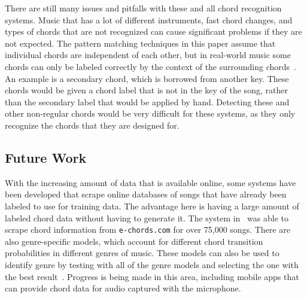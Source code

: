 \documentclass{sig-alternate}
\begin{document}
There are still many issues and pitfalls with these and all chord recognition systems. Music that has a lot of different instruments, fast chord changes, and types of chords that are not recognized can cause significant problems if they are not expected. The pattern matching techniques in this paper assume that individual chords are independent of each other, but in real-world music some chords can only be labeled correctly by the context of the surrounding chords~\cite{TaeMin:2014}. An example is a secondary chord, which is borrowed from another key. These chords would be given a chord label that is not in the key of the song, rather than the secondary label that would be applied by hand. Detecting these and other non-regular chords would be very difficult for these systems, as they only recognize the chords that they are designed for.    



\subsection{Future Work}

With the increasing amount of data that is available online, some systems have been developed that scrape online databases of songs that have already been labeled to use for training data. The advantage here is having a large amount of labeled chord data without having to generate it. The system in~\cite{McVicar:2010} was able to scrape chord information from \texttt{e-chords.com} for over 75,000 songs. There are also genre-specific models, which account for different chord transition probabilities in different genres of music. These models can also be used to identify genre by testing with all of the genre models and selecting the one with the best result~\cite{McVicar:2014}. Progress is being made in this area, including mobile apps that can provide chord data for audio captured with the microphone.
\end{document}
